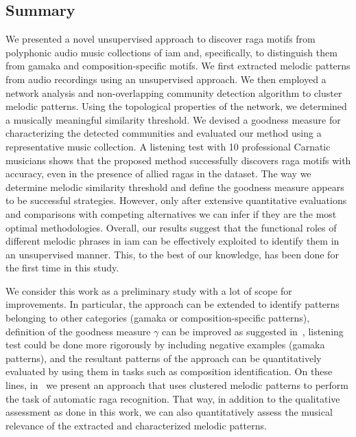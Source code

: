 {\subsection{Summary}
\label{sec:patterns_characterization_summary}

We presented a novel unsupervised approach to discover \gls{raga} motifs from polyphonic audio music collections of \gls{iam} and, specifically, to distinguish them from gamaka and composition-specific motifs. We first extracted melodic patterns from audio recordings using an unsupervised approach. We then employed a network analysis and non-overlapping community detection algorithm to cluster melodic patterns. Using the topological properties of the network, we determined a musically meaningful similarity threshold. We devised a goodness measure for characterizing the detected communities and evaluated our method using a representative music collection. A listening test with 10 professional Carnatic musicians shows that the proposed method successfully discovers \gls{raga} motifs with accuracy, even in the presence of allied \glspl{raga} in the dataset. The way we determine melodic similarity threshold and define the goodness measure appears to be successful strategies. However, only after extensive quantitative evaluations and comparisons with competing alternatives we can infer if they are the most optimal methodologies. Overall, our results suggest that the functional roles of different melodic phrases in \gls{iam} can be effectively exploited to identify them in an unsupervised manner. This, to the best of our knowledge, has been done for the first time in this study. 


We consider this work as a preliminary study with a lot of scope for improvements. In particular, the approach can be extended to identify patterns belonging to other categories (\gls{gamaka} or composition-specific patterns), definition of the goodness measure $\gamma$ can be improved as suggested in~, listening test could be done more rigorously by including negative examples (\gls{gamaka} patterns), and the resultant patterns of the approach can be quantitatively evaluated by using them in tasks such as composition identification. On these lines, in~ we present an approach that uses clustered melodic patterns to perform the task of automatic \gls{raga} recognition. That way, in addition to the qualitative assessment as done in this work, we can also quantitatively assess the musical relevance of the extracted and characterized melodic patterns.


}
